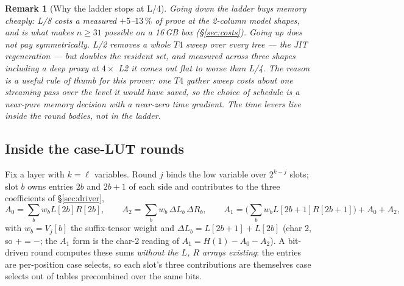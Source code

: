 \documentclass[11pt]{article}
\newtheorem{remark}{Remark}
\theoremstyle{definition}
\begin{document}
\begin{remark}[Why the ladder stops at L/4]
Going \emph{down} the ladder buys memory cheaply: L/8 costs a measured
$+5$--$13\,\%$ of prove at the 2-column model shapes, and is what makes
$n \ge 31$ possible on a 16\,GB box (\S\ref{sec:costs}).  Going
\emph{up} does not pay symmetrically.  L/2 removes a whole $T4$ sweep
over every tree --- the JIT regeneration --- but doubles the resident
set, and measured across three shapes including a deep proxy at
$4\times$ L2 it comes out flat to worse than L/4.  The reason is a
useful rule of thumb for this prover: one $T4$ gather sweep costs about
one streaming pass over the level it would have saved, so the choice of
schedule is a near-pure \emph{memory} decision with a near-zero time
gradient.  The time levers live inside the round bodies, not in the
ladder.
\end{remark}

\subsection{Inside the case-LUT rounds}
\label{sec:lutrounds}

Fix a layer with $k = \ell$ variables.  Round $j$ binds the low variable
over $2^{k-j}$ slots; slot $b$ owns entries $2b$ and $2b{+}1$ of each
side and contributes to the three coefficients of \S\ref{sec:driver},
\[
  A_0 = \sum_b w_b L[2b]R[2b], \qquad
  A_2 = \sum_b w_b\,\Delta L_b\,\Delta R_b, \qquad
  A_1 = \Big(\sum_b w_b L[2b{+}1]R[2b{+}1]\Big) + A_0 + A_2 ,
\]
with $w_b = V_j[b]$ the suffix-tensor weight and
$\Delta L_b = L[2b{+}1] + L[2b]$ (char 2, so $+ = -$; the $A_1$ form is
the char-2 reading of $A_1 = H(1) - A_0 - A_2$).  A bit-driven round
computes these sums \emph{without the $L$, $R$ arrays existing}: the
entries are per-position case selects, so each slot's three
contributions are themselves case selects out of tables precombined over
the same bits.
\end{document}
